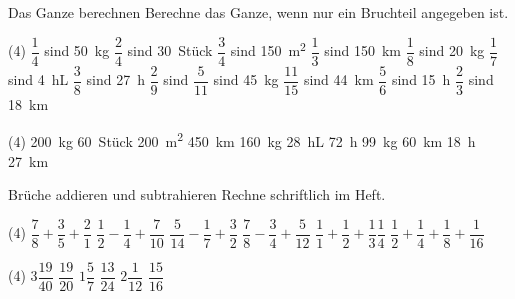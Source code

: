 \documentclass[12pt,a5paper,landscape]{scrartcl}
\begin{document}
	\begin{karte2}{Das Ganze berechnen}
		Berechne das Ganze, wenn nur ein Bruchteil angegeben ist.
		
		\begin{tasks}(4)
			\task $\dfrac{1}{4}$ sind \SI{50}{\kilo\gram}
			\task $\dfrac{2}{4}$ sind \SI{30}{Stück}
			\task $\dfrac{3}{4}$ sind \SI{150}{\square\meter}
			\task $\dfrac{1}{3}$ sind \SI{150}{\kilo\meter}
			\task $\dfrac{1}{8}$ sind \SI{20}{\kilo\gram}
			\task $\dfrac{1}{7}$ sind \SI{4}{\hecto\liter}
			\task $\dfrac{3}{8}$ sind \SI{27}{\hour}
			\task $\dfrac{2}{9}$ sind 
			\task $\dfrac{5}{11}$ sind \SI{45}{\kilo\gram}
			\task $\dfrac{11}{15}$ sind \SI{44}{\kilo\meter}
			\task $\dfrac{5}{6}$ sind \SI{15}{\hour}
			\task $\dfrac{2}{3}$ sind \SI{18}{\kilo\meter}
		\end{tasks}
	\end{karte2}
	
	\begin{loesungskarte}
		\begin{tasks}(4)
			\task \SI{200}{\kilo\gram}
			\task \SI{60}{Stück}
			\task \SI{200}{\square\meter}
			\task \SI{450}{\kilo\meter}
			\task \SI{160}{\kilo\gram}
			\task \SI{28}{\hecto\liter}
			\task \SI{72}{\hour}
			\task \EUR{63}
			\task \SI{99}{\kilo\gram}
			\task \SI{60}{\kilo\meter}
			\task \SI{18}{\hour}
			\task \SI{27}{\kilo\meter}
		\end{tasks}
	\end{loesungskarte}
	
	\begin{karte1}{Brüche addieren und subtrahieren}\hilfeMarke{addition}
		Rechne schriftlich im Heft.
		\begin{tasks}(4)
			\task $\dfrac{7}{8} + \dfrac{3}{5} + \dfrac{2}{1}$
			\task $\dfrac{1}{2} - \dfrac{1}{4} + \dfrac{7}{10}$
			\task $\dfrac{5}{14} - \dfrac{1}{7} + \dfrac{3}{2}$
			\task $\dfrac{7}{8} - \dfrac{3}{4} + \dfrac{5}{12}$
			\task $\dfrac{1}{1} + \dfrac{1}{2} + \dfrac{1}{3} \dfrac{1}{4}$
			\task $\dfrac{1}{2} + \dfrac{1}{4} + \dfrac{1}{8} + \dfrac{1}{16}$
		\end{tasks}
	\end{karte1}
	
	\begin{loesungskarte}
		\vspace*{1cm}
		\begin{tasks}(4)
			\task $3\dfrac{19}{40}$
			\task $\dfrac{19}{20}$
			\task $1\dfrac{5}{7}$
			\task $\dfrac{13}{24}$
			\task $2\dfrac{1}{12}$
			\task $\dfrac{15}{16}$
		\end{tasks}
	\end{loesungskarte}
	
\end{document}

